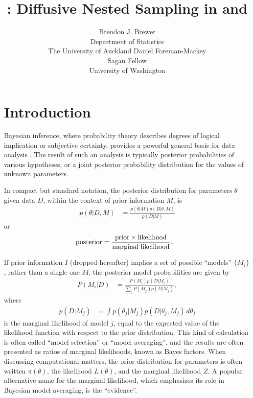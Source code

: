 \documentclass[article]{jss}
\author{Brendon J. Brewer\\Department of Statistics\\The University of Auckland\And 
        Daniel Foreman-Mackey\\Sagan Fellow\\University of Washington}
\title{\pkg{DNest4}: Diffusive Nested Sampling in
\proglang{C++} and \proglang{Python}}
\newcommand{\params}{\theta}
\newcommand{\data}{D}
\begin{document}
\maketitle


\section{Introduction}
Bayesian inference, where probability theory describes degrees of
logical implication or subjective certainty, provides a powerful general basis
for data analysis \citep{o2004kendall, sivia2006data}. The result of such
an analysis is typically
posterior probabilities of various hypotheses, or
a joint posterior probability distribution for the values of unknown
parameters.

In compact but standard notation, the posterior distribution for
parameters $\params$ given data $\data$, within the context of prior
information $M$, is
\begin{align*}
p(\params | \data, M) &=
\frac{p(\params | M)p(\data | \params, M)}{p(\data | M)}
\end{align*}
or
\begin{align*}
\textnormal{posterior} &=
\frac{\textnormal{prior} \times \textnormal{likelihood}}
     {\textnormal{marginal likelihood}}.
\end{align*}

If prior information $I$ (dropped hereafter)
implies a set of possible ``models'' $\{M_i\}$,
rather than a single one $M$, the posterior model probabilities are given by
\begin{align*}
P(M_i | \data) &=
\frac{P(M_i)p(\data | M_i)}{\sum_j P(M_j)p(\data | M_j)},
\end{align*}
where
\begin{align*}
p(\data | M_j) &= \int p(\theta_j | M_j)p(\data | \theta_j, M_j) \, d\theta_j
\end{align*}
is the marginal likelihood of model $j$, equal to the expected value of the
likelihood function with respect to the prior distribution.
This kind of calculation is often
called ``model selection'' or ``model averaging'', and the results
are often presented as ratios
of marginal likelihoods, known as Bayes factors.
When discussing computational matters, the prior distribution for parameters
is
often written $\pi(\theta)$, the likelihood $L(\theta)$,
and the marginal likelihood $Z$. A popular alternative name for the marginal
likelihood, which emphasizes its role in Bayesian model averaging,
is the ``evidence''.
\end{document}
